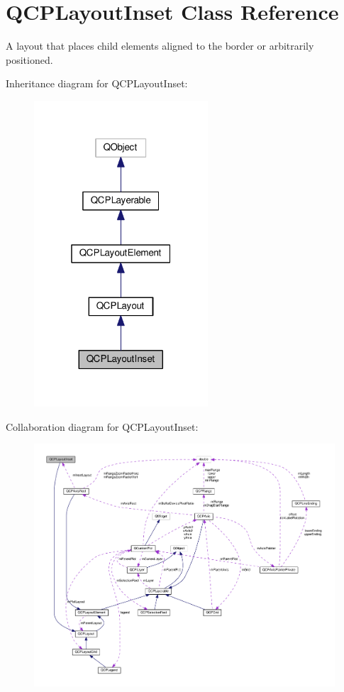 \hypertarget{classQCPLayoutInset}{}\section{Q\+C\+P\+Layout\+Inset Class Reference}
\label{classQCPLayoutInset}


A layout that places child elements aligned to the border or arbitrarily positioned.  




Inheritance diagram for Q\+C\+P\+Layout\+Inset\+:
\nopagebreak
\begin{figure}[H]
\begin{center}
\leavevmode
\includegraphics[width=184pt]{classQCPLayoutInset__inherit__graph}
\end{center}
\end{figure}


Collaboration diagram for Q\+C\+P\+Layout\+Inset\+:
\nopagebreak
\begin{figure}[H]
\begin{center}
\leavevmode
\includegraphics[width=350pt]{classQCPLayoutInset__coll__graph}
\end{center}
\end{figure}
